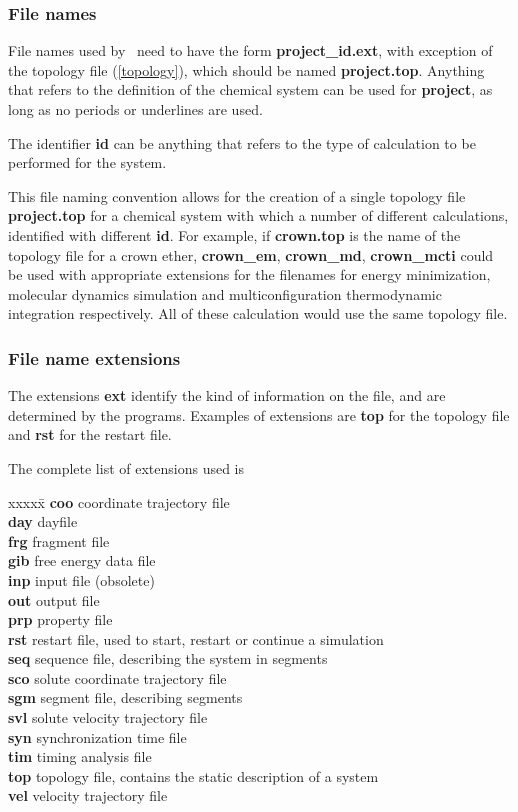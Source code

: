 \subsubsection{File names}
\label{filenames}
\par
File names used by \nwargos\  need to have the form
{\bf project\_id.ext}, with exception of the
topology file (\ref{topology}), which should be named {\bf project.top}.
Anything that refers to the definition of the chemical system can be used
for {\bf project}, as long as no periods or underlines are used.
\par
The identifier {\bf id} can be anything that refers to the type of 
calculation to be performed for the system.
\par
This file naming convention allows for the creation of a single topology file
{\bf project.top} for a chemical system with which a number of different 
calculations, identified with different {\bf id}.
For example, if {\bf crown.top} is the name of the topology file for
a crown ether, {\bf crown\_em}, {\bf crown\_md}, {\bf crown\_mcti} could
be used with appropriate extensions for the filenames for energy
minimization, molecular dynamics simulation and multiconfiguration
thermodynamic integration respectively. All of these calculation
would use the same topology file.
\subsubsection{File name extensions}
\label{extensions}
\par
The extensions {\bf ext} 
identify the kind of information on the file, and are determined by the 
programs. Examples of extensions are {\bf top} for the topology file and 
{\bf rst} for the restart file.
\par
The complete list of extensions used is
\begin{tabbing}
xxxxx\=\kill
{\bf coo} \> coordinate trajectory file\\
{\bf day} \> dayfile\\
{\bf frg} \> fragment file\\
{\bf gib} \> free energy data file\\
{\bf inp} \> input file (obsolete)\\
{\bf out} \> output file\\
{\bf prp} \> property file\\
{\bf rst} \> restart file, used to start, restart or continue a simulation \\
{\bf seq} \> sequence file, describing the system in segments\\
{\bf sco} \> solute coordinate trajectory file\\
{\bf sgm} \> segment file, describing segments\\
{\bf svl} \> solute velocity trajectory file\\
{\bf syn} \> synchronization time file\\
{\bf tim} \> timing analysis file\\
{\bf top} \> topology file, contains the static description of a system\\
{\bf vel} \> velocity trajectory file\\
\end{tabbing}

